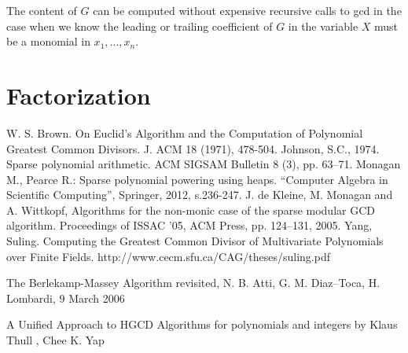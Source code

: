 \documentclass[12pt,reqno]{amsart}
\numberwithin{equation}{section}
\begin{document}
The content of $G$ can be computed without expensive recursive calls to gcd in the case when we know the leading or trailing coefficient of $G$ in the variable $X$ must be a monomial in $x_1,\dots,x_n$.


\section{Factorization}

\begin{thebibliography}{99}
 W. S. Brown. On Euclid’s Algorithm and the
Computation of Polynomial Greatest Common Divisors.
J. ACM 18 (1971), 478-504.
 Johnson, S.C., 1974. Sparse polynomial arithmetic. ACM SIGSAM Bulletin 8 (3), pp. 63--71.
 Monagan M., Pearce R.: Sparse polynomial powering using heaps. “Computer Algebra in Scientific Computing”, Springer, 2012, s.236-247. 
  J. de Kleine, M. Monagan and A. Wittkopf, Algorithms for the non-monic case of the sparse
modular GCD algorithm. Proceedings of ISSAC ’05,
ACM Press, pp. 124--131, 2005.
 Yang, Suling. Computing the Greatest Common Divisor of Multivariate Polynomials over Finite Fields. http://www.cecm.sfu.ca/CAG/theses/suling.pdf

 The Berlekamp-Massey Algorithm revisited, N. B. Atti, G. M. Diaz–Toca, H. Lombardi, 9 March 2006

 A Unified Approach to HGCD Algorithms for polynomials and integers by Klaus Thull , Chee K. Yap
 
\end{thebibliography}
\end{document}
